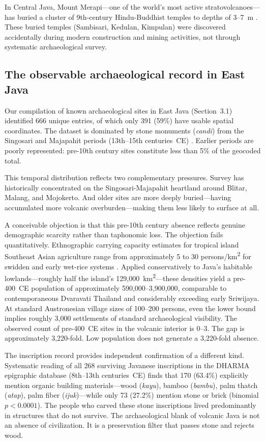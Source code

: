 \documentclass[12pt,a4paper]{article}
\begin{document}
In Central Java, Mount Merapi---one of the world's most active stratovolcanoes---has buried a cluster of 9th-century Hindu-Buddhist temples to depths of 3--7~m \citep{lavigne2000,thouret2000}. These buried temples (Sambisari, Kedulan, Kimpulan) were discovered accidentally during modern construction and mining activities, not through systematic archaeological survey.

\subsection{The observable archaeological record in East Java}

Our compilation of known archaeological sites in East Java (Section~3.1) identified 666 unique entries, of which only 391 (59\%) have usable spatial coordinates. The dataset is dominated by stone monuments (\textit{candi}) from the Singosari and Majapahit periods (13th--15th centuries~CE) \citep{kinney2003}. Earlier periods are poorly represented: pre-10th century sites constitute less than 5\% of the geocoded total.

This temporal distribution reflects two complementary pressures. Survey has historically concentrated on the Singosari-Majapahit heartland around Blitar, Malang, and Mojokerto. And older sites are more deeply buried---having accumulated more volcanic overburden---making them less likely to surface at all.

A conceivable objection is that this pre-10th century absence reflects genuine demographic scarcity rather than taphonomic loss. The objection fails quantitatively. Ethnographic carrying capacity estimates for tropical island Southeast Asian agriculture range from approximately 5 to 30 persons/km\textsuperscript{2} for swidden and early wet-rice systems \citep{bellwood2017,kirch2000,baylisssmith1980}. Applied conservatively to Java's habitable lowlands---roughly half the island's 129,000~km\textsuperscript{2}---these densities yield a pre-400~CE population of approximately 590,000--3,900,000, comparable to contemporaneous Dvaravati Thailand and considerably exceeding early Sriwijaya. At standard Austronesian village sizes of 100--200 persons, even the lower bound implies roughly 3,000 settlements of standard archaeological visibility. The observed count of pre-400~CE sites in the volcanic interior is 0--3. The gap is approximately 3,220-fold. Low population does not generate a 3,220-fold absence.

The inscription record provides independent confirmation of a different kind. Systematic reading of all 268 surviving Javanese inscriptions in the DHARMA epigraphic database (8th--13th centuries~CE) \citep{dharma2024} finds that 170 (63.4\%) explicitly mention organic building materials---wood (\textit{kayu}), bamboo (\textit{bambu}), palm thatch (\textit{atap}), palm fiber (\textit{ijuk})---while only 73 (27.2\%) mention stone or brick (binomial $p < 0.0001$). The people who carved these stone inscriptions lived predominantly in structures that do not survive. The archaeological blank of volcanic Java is not an absence of civilization. It is a preservation filter that passes stone and rejects wood.
\end{document}
